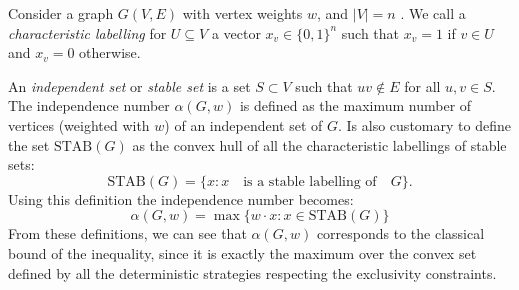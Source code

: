 \documentclass[letterpaper]{article}
\newcommand{\STAB}{\mathrm{STAB}}
\begin{document}
Consider a graph $G(V,E)$ with vertex weights $w$, and $|V| = n$ .
We call a \emph{characteristic labelling} for $U \subseteq V$ a vector $x_v \in
\{0,1\}^n$ such that $x_v = 1$ if $v \in U$ and $x_v = 0$ otherwise.

An \emph{independent set} or \emph{stable set} is a set
$S \subset V$ such that $uv \notin E$ for all $u,v \in S$.
The independence number $\alpha(G, w)$ is defined as the maximum number of
vertices (weighted with $w$) of an independent set of $G$. Is also customary to
define the set $\STAB(G)$ as the convex hull of all the
characteristic labellings of stable sets:
\begin{equation} 
    \STAB(G) = \{x : x \quad \text{is a stable labelling of}\quad G \}.
    \label{eq:stab}
\end{equation}
Using this definition the independence number becomes:
\begin{equation}
    \alpha(G,w) = \max\{w\cdot x: x \in \STAB(G)\}
    \label{eq:alphastab}
\end{equation}
From these definitions, we can see that $\alpha(G,w)$ corresponds to the classical bound of the inequality, since it is exactly the maximum over the convex set defined by all the deterministic strategies respecting the exclusivity constraints.
\end{document}
